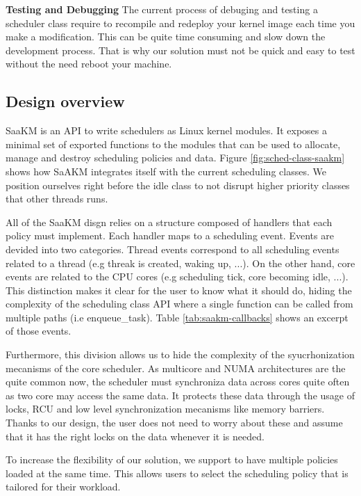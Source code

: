 \textbf{Testing and Debugging} The current process of debuging and testing a scheduler class require to recompile and redeploy your kernel image each time you make a modification. This can be quite time consuming and slow down the development process. That is why our solution must not be quick and easy to test without the need reboot your machine.
\subsection{Design overview}
\par SaaKM is an API to write schedulers as Linux kernel modules. It exposes a minimal set of exported functions to the modules that can be used to allocate, manage and destroy scheduling policies and data. Figure \ref{fig:sched-class-saakm} shows how SaAKM integrates itself with the current scheduling classes. We position ourselves right before the idle class to not disrupt higher priority classes that other threads runs.\newline

\par All of the SaaKM disgn relies on a structure composed of handlers that each policy must implement. Each handler maps to a scheduling event. Events are devided into two categories. Thread events correspond to all scheduling events related to a thread (e.g threak is created, waking up, ...). On the other hand, core events are related to the CPU cores (e.g scheduling tick, core becoming idle, ...). This distinction makes it clear for the user to know what it should do, hiding the complexity of the scheduling class API where a single function can be called from multiple paths (i.e enqueue\_task). Table \ref{tab:saakm-callbacks} shows an excerpt of those events.\newline

\par Furthermore, this division allows us to hide the complexity of the syucrhonization mecanisms of the core scheduler. As multicore and NUMA architectures are the quite common now, the scheduler must synchroniza data across cores quite often as two core may access the same data. It protects these data through the usage of locks, RCU and low level synchronization mecanisms like memory barriers. Thanks to our design, the user does not need to worry about these and assume that it has the right locks on the data whenever it is needed. \newline

\par To increase the flexibility of our solution, we support to have multiple policies loaded at the same time. This allows users to select the scheduling policy that is tailored for their workload.


